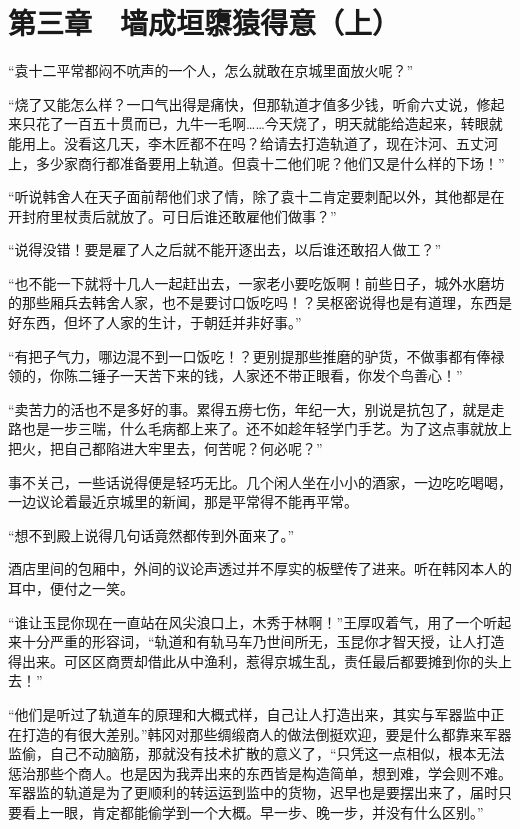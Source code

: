 \section{第三章　墙成垣隳猿得意（上）}

“袁十二平常都闷不吭声的一个人，怎么就敢在京城里面放火呢？”

“烧了又能怎么样？一口气出得是痛快，但那轨道才值多少钱，听俞六丈说，修起来只花了一百五十贯而已，九牛一毛啊……今天烧了，明天就能给造起来，转眼就能用上。没看这几天，李木匠都不在吗？给请去打造轨道了，现在汴河、五丈河上，多少家商行都准备要用上轨道。但袁十二他们呢？他们又是什么样的下场！”

“听说韩舍人在天子面前帮他们求了情，除了袁十二肯定要刺配以外，其他都是在开封府里杖责后就放了。可日后谁还敢雇他们做事？”

“说得没错！要是雇了人之后就不能开逐出去，以后谁还敢招人做工？”

“也不能一下就将十几人一起赶出去，一家老小要吃饭啊！前些日子，城外水磨坊的那些厢兵去韩舍人家，也不是要讨口饭吃吗！？吴枢密说得也是有道理，东西是好东西，但坏了人家的生计，于朝廷并非好事。”

“有把子气力，哪边混不到一口饭吃！？更别提那些推磨的驴货，不做事都有俸禄领的，你陈二锤子一天苦下来的钱，人家还不带正眼看，你发个鸟善心！”

“卖苦力的活也不是多好的事。累得五痨七伤，年纪一大，别说是抗包了，就是走路也是一步三喘，什么毛病都上来了。还不如趁年轻学门手艺。为了这点事就放上把火，把自己都陷进大牢里去，何苦呢？何必呢？”

事不关己，一些话说得便是轻巧无比。几个闲人坐在小小的酒家，一边吃吃喝喝，一边议论着最近京城里的新闻，那是平常得不能再平常。

“想不到殿上说得几句话竟然都传到外面来了。”

酒店里间的包厢中，外间的议论声透过并不厚实的板壁传了进来。听在韩冈本人的耳中，便付之一笑。

“谁让玉昆你现在一直站在风尖浪口上，木秀于林啊！”王厚叹着气，用了一个听起来十分严重的形容词，“轨道和有轨马车乃世间所无，玉昆你才智天授，让人打造得出来。可区区商贾却借此从中渔利，惹得京城生乱，责任最后都要摊到你的头上去！”

“他们是听过了轨道车的原理和大概式样，自己让人打造出来，其实与军器监中正在打造的有很大差别。”韩冈对那些绸缎商人的做法倒挺欢迎，要是什么都靠来军器监偷，自己不动脑筋，那就没有技术扩散的意义了，“只凭这一点相似，根本无法惩治那些个商人。也是因为我弄出来的东西皆是构造简单，想到难，学会则不难。军器监的轨道是为了更顺利的转运运到监中的货物，迟早也是要摆出来了，届时只要看上一眼，肯定都能偷学到一个大概。早一步、晚一步，并没有什么区别。”

